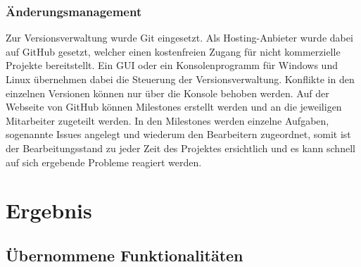 
\subsubsection{Änderungsmanagement}
Zur Versionsverwaltung wurde Git eingesetzt. Als Hosting-Anbieter wurde dabei auf GitHub gesetzt, welcher einen kostenfreien Zugang für nicht kommerzielle Projekte bereitstellt. Ein \ac{GUI} oder ein Konsolenprogramm für Windows und Linux übernehmen dabei die Steuerung der Versionsverwaltung. Konflikte in den einzelnen Versionen können nur über die Konsole behoben werden. Auf der Webseite von GitHub können Milestones erstellt werden und an die jeweiligen Mitarbeiter zugeteilt werden. In den Milestones werden einzelne Aufgaben, sogenannte Issues angelegt und wiederum den Bearbeitern zugeordnet, somit ist der Bearbeitungsstand zu jeder Zeit des Projektes ersichtlich und es kann schnell auf sich ergebende Probleme reagiert werden.




\section{Ergebnis}
\subsection{Übernommene Funktionalitäten}

